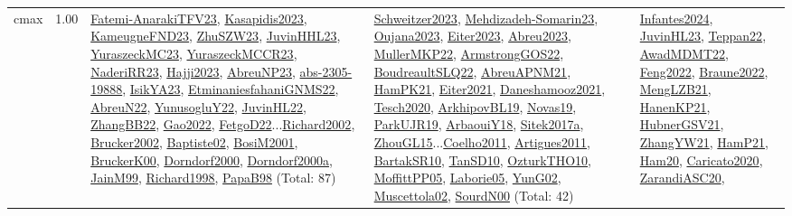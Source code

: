 {\begin{longtable}{p{3cm}r>{\raggedright\arraybackslash}p{6cm}>{\raggedright\arraybackslash}p{6cm}>{\raggedright\arraybackslash}p{8cm}}
\index{cmax}\index{Concepts!cmax}cmax &  1.00 & \hyperref[detail:Fatemi-AnarakiTFV23]{Fatemi-AnarakiTFV23}, \hyperref[detail:Kasapidis2023]{Kasapidis2023}, \hyperref[detail:KameugneFND23]{KameugneFND23}, \hyperref[detail:ZhuSZW23]{ZhuSZW23}, \hyperref[detail:JuvinHHL23]{JuvinHHL23}, \hyperref[detail:YuraszeckMC23]{YuraszeckMC23}, \hyperref[detail:YuraszeckMCCR23]{YuraszeckMCCR23}, \hyperref[detail:NaderiRR23]{NaderiRR23}, \hyperref[detail:Hajji2023]{Hajji2023}, \hyperref[detail:AbreuNP23]{AbreuNP23}, \hyperref[detail:abs-2305-19888]{abs-2305-19888}, \hyperref[detail:IsikYA23]{IsikYA23}, \hyperref[detail:EtminaniesfahaniGNMS22]{EtminaniesfahaniGNMS22}, \hyperref[detail:AbreuN22]{AbreuN22}, \hyperref[detail:YunusogluY22]{YunusogluY22}, \hyperref[detail:JuvinHL22]{JuvinHL22}, \hyperref[detail:ZhangBB22]{ZhangBB22}, \hyperref[detail:Gao2022]{Gao2022}, \hyperref[detail:FetgoD22]{FetgoD22}...\hyperref[detail:Richard2002]{Richard2002}, \hyperref[detail:Brucker2002]{Brucker2002}, \hyperref[detail:Baptiste02]{Baptiste02}, \hyperref[detail:BosiM2001]{BosiM2001}, \hyperref[detail:BruckerK00]{BruckerK00}, \hyperref[detail:Dorndorf2000]{Dorndorf2000}, \hyperref[detail:Dorndorf2000a]{Dorndorf2000a}, \hyperref[detail:JainM99]{JainM99}, \hyperref[detail:Richard1998]{Richard1998}, \hyperref[detail:PapaB98]{PapaB98} (Total: 87) & \hyperref[detail:Schweitzer2023]{Schweitzer2023}, \hyperref[detail:Mehdizadeh-Somarin23]{Mehdizadeh-Somarin23}, \hyperref[detail:Oujana2023]{Oujana2023}, \hyperref[detail:Eiter2023]{Eiter2023}, \hyperref[detail:Abreu2023]{Abreu2023}, \hyperref[detail:MullerMKP22]{MullerMKP22}, \hyperref[detail:ArmstrongGOS22]{ArmstrongGOS22}, \hyperref[detail:BoudreaultSLQ22]{BoudreaultSLQ22}, \hyperref[detail:AbreuAPNM21]{AbreuAPNM21}, \hyperref[detail:HamPK21]{HamPK21}, \hyperref[detail:Eiter2021]{Eiter2021}, \hyperref[detail:Daneshamooz2021]{Daneshamooz2021}, \hyperref[detail:Tesch2020]{Tesch2020}, \hyperref[detail:ArkhipovBL19]{ArkhipovBL19}, \hyperref[detail:Novas19]{Novas19}, \hyperref[detail:ParkUJR19]{ParkUJR19}, \hyperref[detail:ArbaouiY18]{ArbaouiY18}, \hyperref[detail:Sitek2017a]{Sitek2017a}, \hyperref[detail:ZhouGL15]{ZhouGL15}...\hyperref[detail:Coelho2011]{Coelho2011}, \hyperref[detail:Artigues2011]{Artigues2011}, \hyperref[detail:BartakSR10]{BartakSR10}, \hyperref[detail:TanSD10]{TanSD10}, \hyperref[detail:OzturkTHO10]{OzturkTHO10}, \hyperref[detail:MoffittPP05]{MoffittPP05}, \hyperref[detail:Laborie05]{Laborie05}, \hyperref[detail:YunG02]{YunG02}, \hyperref[detail:Muscettola02]{Muscettola02}, \hyperref[detail:SourdN00]{SourdN00} (Total: 42) & \hyperref[detail:Infantes2024]{Infantes2024}, \hyperref[detail:JuvinHL23]{JuvinHL23}, \hyperref[detail:Teppan22]{Teppan22}, \hyperref[detail:AwadMDMT22]{AwadMDMT22}, \hyperref[detail:Feng2022]{Feng2022}, \hyperref[detail:Braune2022]{Braune2022}, \hyperref[detail:MengLZB21]{MengLZB21}, \hyperref[detail:HanenKP21]{HanenKP21}, \hyperref[detail:HubnerGSV21]{HubnerGSV21}, \hyperref[detail:ZhangYW21]{ZhangYW21}, \hyperref[detail:HamP21]{HamP21}, \hyperref[detail:Ham20]{Ham20}, \hyperref[detail:Caricato2020]{Caricato2020}, \hyperref[detail:ZarandiASC20]{ZarandiASC20}, 
\end{longtable}}
